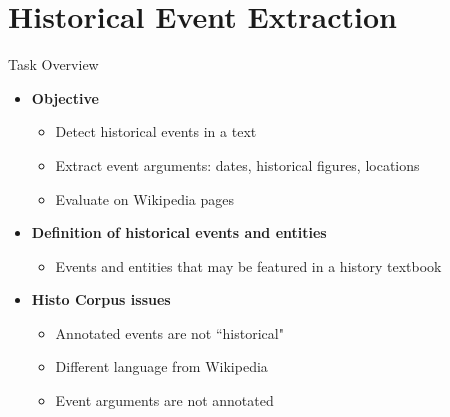 \documentclass[10pt,aspectratio=1610,professionalfont]{beamer}
\begin{document}
\section{Historical Event Extraction}

\begin{frame}{Task Overview}
    \begin{itemize}
        \item \textbf{Objective}
        \begin{itemize}
            \item Detect historical events in a text
            \item Extract event arguments: dates, historical figures, locations
            \item Evaluate on Wikipedia pages  
        \end{itemize} 
        \item \textbf{Definition of historical events and entities}
        \begin{itemize}
            \item Events and entities that may be featured in a history textbook 
        \end{itemize}
        \item \textbf{Histo Corpus issues}
        \begin{itemize}
            \item Annotated events are not “historical"
            \item Different language from Wikipedia
            \item Event arguments are not annotated   
        \end{itemize} 
    \end{itemize}
\end{frame}
\end{document}
